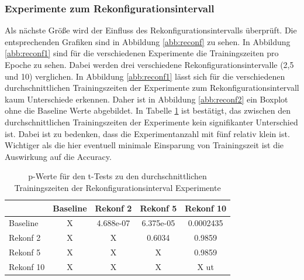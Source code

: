 \subsubsection{Experimente zum Rekonfigurationsintervall}
 Als nächste Größe wird der Einfluss des Rekonfigurationsintervalls überprüft. Die entsprechenden Grafiken sind in Abbildung \ref{abb:reconf} zu sehen. In Abbildung \ref{abb:reconf1} sind für die verschiedenen Experimente die Trainingszeiten pro Epoche zu sehen. Dabei werden drei verschiedene Rekonfigurationsintervalle (2,5 und 10) verglichen. In Abbildung \ref{abb:reconf1} lässt sich für die verschiedenen durchschnittlichen Trainingszeiten der Experimente zum Rekonfigurationsintervall kaum Unterschiede erkennen. Daher ist in Abbildung \ref{abb:reconf2} ein Boxplot ohne die Baseline Werte abgebildet. In Tabelle \ref{tab:reconf} ist bestätigt, das zwischen den durchschnittlichen Trainingszeiten der Experimente kein signifikanter Unterschied ist. Dabei ist zu bedenken, dass die Experimentanzahl mit fünf relativ klein ist. Wichtiger als die hier eventuell minimale Einsparung von Trainingszeit ist die Auswirkung auf die Accuracy.
 


\begin{table}[]
\caption{p-Werte für den t-Tests zu den durchschnittlichen Trainingszeiten der Rekonfigurationsinterval Experimente }

\begin{tabular}{l|c|c|c|c|}
\cline{2-5}
                                & \multicolumn{1}{l|}{Baseline} & \multicolumn{1}{l|}{Rekonf 2}     & \multicolumn{1}{l|}{Rekonf 5}     & \multicolumn{1}{l|}{Rekonf 10}    \\ \hline
\multicolumn{1}{|l|}{Baseline}  & X                             & \cellcolor[HTML]{FFFFFF}4.688e-07 & \cellcolor[HTML]{FFFFFF}6.375e-05 & \cellcolor[HTML]{FFFFFF}0.0002435 \\ \hline
\multicolumn{1}{|l|}{Rekonf 2}  & X                             & X                                 & \cellcolor[HTML]{FE0000}0.6034    & \cellcolor[HTML]{FE0000}0.9859    \\ \hline
\multicolumn{1}{|l|}{Rekonf 5}  & X                             & X                                 & X                                 & \cellcolor[HTML]{FE0000}0.9859    \\ \hline
\multicolumn{1}{|l|}{Rekonf 10} & X                             & X                                 & X                                 & X                            ut     \\ \hline
\end{tabular}
\label{tab:reconf}
\end{table}
 
